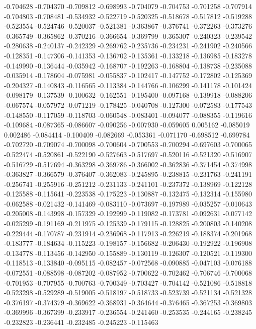 -0.704628
-0.704370
-0.709812
-0.698993
-0.704079
-0.704753
-0.701258
-0.707914
-0.704803
-0.708481
-0.534932
-0.522719
-0.520325
-0.518678
-0.517812
-0.519288
-0.523554
-0.524746
-0.520037
-0.521381
-0.363867
-0.376741
-0.372263
-0.373276
-0.365749
-0.365862
-0.370216
-0.366654
-0.369799
-0.365307
-0.240323
-0.239542
-0.280638
-0.240137
-0.242329
-0.269762
-0.235736
-0.234231
-0.241902
-0.240566
-0.128351
-0.147306
-0.141353
-0.136702
-0.135361
-0.133218
-0.136985
-0.183278
-0.149990
-0.136444
-0.035942
-0.168707
-0.192263
-0.168804
-0.138738
-0.235088
-0.035914
-0.178604
-0.075981
-0.055837
-0.102417
-0.147752
-0.172802
-0.125369
-0.204327
-0.140843
-0.116565
-0.113384
-0.144766
-0.106299
-0.141178
-0.101424
-0.098179
-0.137539
-0.100632
-0.162551
-0.195400
-0.097168
-0.139918
-0.088206
-0.067574
-0.057972
-0.071219
-0.178425
-0.040708
-0.127300
-0.072583
-0.177543
-0.148550
-0.117059
-0.118703
-0.060548
-0.083401
-0.094077
-0.088355
-0.119616
-0.109684
-0.087365
-0.086607
-0.090256
-0.007930
-0.059605
0.005162
-0.085019
0.002486
-0.084414
-0.100409
-0.082669
-0.053361
-0.071170
-0.698512
-0.699784
-0.702720
-0.709074
-0.700098
-0.700604
-0.700553
-0.700294
-0.697603
-0.700065
-0.522474
-0.520861
-0.522190
-0.527663
-0.517697
-0.520116
-0.521320
-0.516907
-0.516729
-0.517694
-0.363298
-0.369786
-0.366002
-0.362836
-0.371454
-0.374998
-0.363827
-0.366579
-0.376407
-0.362083
-0.245895
-0.238815
-0.231763
-0.241191
-0.256741
-0.255916
-0.251212
-0.231133
-0.241101
-0.237372
-0.138969
-0.122128
-0.125588
-0.115641
-0.223538
-0.175223
-0.130887
-0.132475
-0.132314
-0.155980
-0.062588
-0.021432
-0.141469
-0.083110
-0.073697
-0.197989
-0.035257
-0.010643
-0.205008
-0.143998
-0.157329
-0.192999
-0.119082
-0.173781
-0.092631
-0.077142
-0.025299
-0.191169
-0.211975
-0.125339
-0.179115
-0.128825
-0.200803
-0.140208
-0.229444
-0.170787
-0.231914
-0.236968
-0.117913
-0.226219
-0.188374
-0.201968
-0.183777
-0.184634
-0.115223
-0.198157
-0.156682
-0.206430
-0.192922
-0.196908
-0.134778
-0.113456
-0.142950
-0.155889
-0.130119
-0.126307
-0.120521
-0.119300
-0.118513
-0.133840
-0.095115
-0.082457
-0.072568
-0.090885
-0.047103
-0.076188
-0.072551
-0.088598
-0.087202
-0.087952
-0.700622
-0.702462
-0.706746
-0.700068
-0.701953
-0.707955
-0.700763
-0.700349
-0.703427
-0.704142
-0.521086
-0.518818
-0.523298
-0.529289
-0.519005
-0.518197
-0.518733
-0.523739
-0.521134
-0.521328
-0.376197
-0.374379
-0.369622
-0.368931
-0.364644
-0.376465
-0.367253
-0.369803
-0.369996
-0.367399
-0.233917
-0.236554
-0.241460
-0.253535
-0.244165
-0.238245
-0.232823
-0.236441
-0.232485
-0.245223
-0.115463
